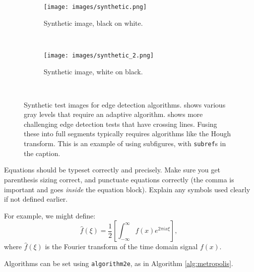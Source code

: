 \documentclass{l4proj}
\begin{document}
\begin{figure}
    \centering
    \begin{subfigure}[b]{0.45\textwidth}
        \texttt{[image: images/synthetic.png]}
        \caption{Synthetic image, black on white.}
        \label{fig:syn1}
    \end{subfigure}
    ~ %
    \begin{subfigure}[b]{0.45\textwidth}
        \texttt{[image: images/synthetic\_2.png]}
        \caption{Synthetic image, white on black.}
        \label{fig:syn2}
    \end{subfigure}
    ~ %
    \caption{Synthetic test images for edge detection algorithms.  shows various gray levels that require an adaptive algorithm. 
    shows more challenging edge detection tests that have crossing lines. Fusing these into full segments typically requires algorithms like the Hough transform.
    This is an example of using subfigures, with \texttt{subref}s in the caption.
    }\label{fig:synthetic}
\end{figure}

\clearpage


Equations should be typeset correctly and precisely. Make sure you get parenthesis sizing correct, and punctuate equations correctly 
(the comma is important and goes \textit{inside} the equation block). Explain any symbols used clearly if not defined earlier. 

For example, we might define:
\begin{equation}
    \hat{f}(\xi) = \frac{1}{2}\left[ \int_{-\infty}^{\infty} f(x) e^{2\pi i x \xi} \right],
\end{equation}    
where $\hat{f}(\xi)$ is the Fourier transform of the time domain signal $f(x)$.

Algorithms can be set using \texttt{algorithm2e}, as in Algorithm \ref{alg:metropolis}.
\end{document}

